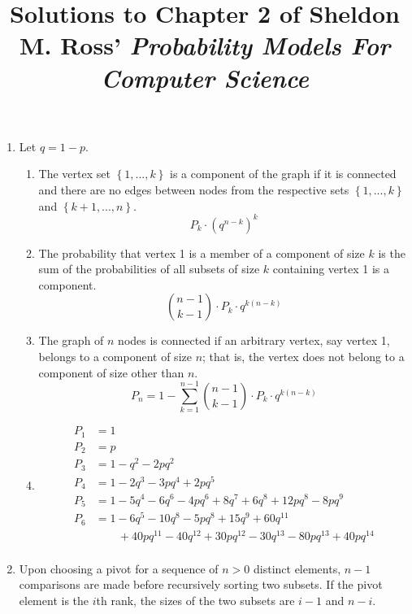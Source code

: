 \documentclass{article}
\title{Solutions to Chapter 2 of Sheldon M. Ross' \textit{Probability Models For Computer Science}}
\date{}
\begin{document}
    \maketitle
\begin{enumerate}
\item
    Let $q=1-p$.
    \begin{enumerate}
    \item
        The vertex set $\left\{1,...,k\right\}$ is a component of the graph if it is connected and
        there are no edges between nodes from the respective sets $\left\{1,...,k\right\}$ and $\left\{k+1,...,n\right\}$.
        \[ P_k \cdot \left(q^{n-k}\right)^k \]

    \item
        The probability that vertex 1 is a member of a component of size $k$ is the sum of the probabilities of all
        subsets of size $k$ containing vertex 1 is a component.
        \[ {n-1 \choose k-1} \cdot P_k \cdot q^{k(n-k)} \]

    \item
        The graph of $n$ nodes is connected if an arbitrary vertex, say vertex 1, belongs to a component of size $n$; that is,
        the vertex does not belong to a component of size other than $n$.
        \[ P_n = 1 - \sum_{k=1}^{n-1} {n-1 \choose k-1} \cdot P_k \cdot q^{k(n-k)} \]
    \item
        \[\begin{split}
            P_1     & = 1 \\
            P_2     & = p \\
            P_3     & = 1 - q^2 - 2pq^2 \\
            P_4     & = 1 - 2q^3 - 3pq^4 + 2pq^5 \\
            P_5     & = 1 - 5q^4 - 6q^6 - 4pq^6 + 8q^7 + 6q^8 + 12pq^8 - 8pq^9 \\
            P_6     & = 1 - 6q^5 - 10q^8 - 5pq^8 + 15q^9 + 60q^{11} \\
                    & \qquad + 40pq^{11} - 40q^{12} + 30pq^{12} - 30q^{13} - 80pq^{13} + 40pq^{14} \\
        \end{split}\]
    \end{enumerate}
\item
    Upon choosing a pivot for a sequence of $n>0$ distinct elements, $n-1$ comparisons are made before recursively sorting two subsets.
    If the pivot element is the $i$th rank, the sizes of the two subsets are $i-1$ and $n-i$.


\end{enumerate}
\end{document}
